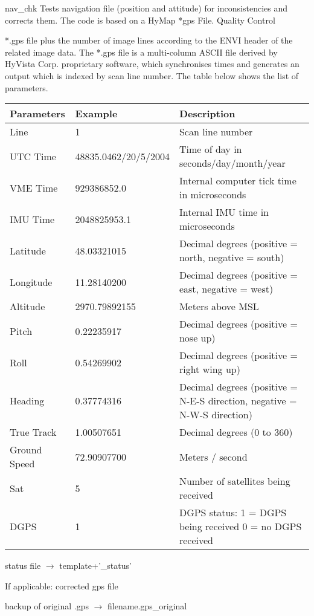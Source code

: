 %
{ %
nav\_chk
}
%
{ %
Tests navigation file (position and attitude) for inconsistencies and corrects them. The code is based on a HyMap *gps File.
}
%
{ %
Quality Control
}
%
{ %
*.gps file plus the number of image lines according to the ENVI header of the related image data.
The *.gps file is a multi-column ASCII file derived by HyVista Corp. proprietary software, which synchronises times and generates an output which is indexed by scan line number. The table below shows the list of parameters. \bigskip

\begin{tabular}{l l p{7cm}}
Parameters & Example & Description \\ \hline
Line & 1 & Scan line number \\ 
UTC Time & 48835.0462/20/5/2004 & Time of day in seconds/day/month/year \\
VME Time & 929386852.0 & Internal computer tick time in microseconds \\
IMU Time & 2048825953.1 & Internal IMU time in microseconds \\
Latitude & 48.03321015 & Decimal degrees (positive = north, negative = south) \\
Longitude & 11.28140200 & Decimal degrees (positive = east, negative = west) \\
Altitude & 2970.79892155 & Meters above MSL \\
Pitch & 0.22235917 & Decimal degrees (positive = nose up) \\
Roll & 0.54269902 & Decimal degrees (positive = right wing up) \\
Heading & 0.37774316 & Decimal degrees (positive = N-E-S direction, negative = N-W-S direction) \\
True Track & 1.00507651 & Decimal degrees (0 to 360) \\
Ground Speed & 72.90907700 & Meters / second \\
Sat & 5 & Number of satellites being received \\
DGPS & 1 & DGPS status: 1 = DGPS being received 0 = no DGPS received 
\end{tabular}
}
%
{ %
status file $\rightarrow$ template+'\_status'

If applicable: corrected gps file

backup of original .gps $\rightarrow$ filename.gps\_original
}
